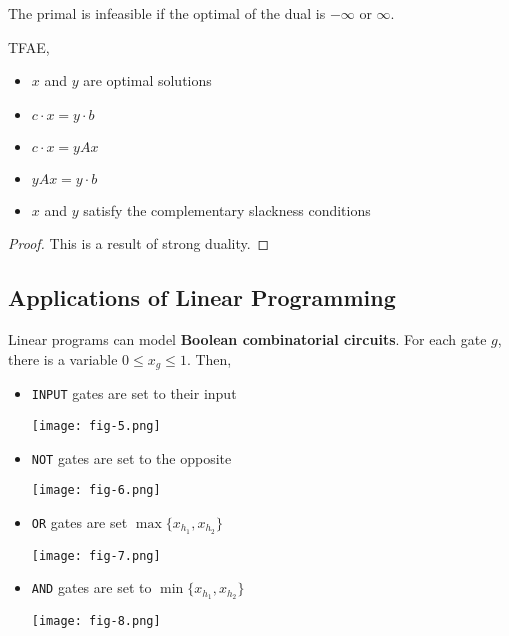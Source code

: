 	\begin{rmk}
		The primal is infeasible if the optimal of the dual is $-\infty$ or $\infty$.
	\end{rmk}

	\begin{thm}
		TFAE,
		\begin{itemize}
			\item $x$ and $y$ are optimal solutions
			\item $c \cdot x = y \cdot b$
			\item $c \cdot x = yAx$
			\item $yAx = y \cdot b$
			\item $x$ and $y$ satisfy the complementary slackness conditions
		\end{itemize}
	\end{thm}

	\begin{proof}
		This is a result of strong duality.
	\end{proof}

	\subsection{Applications of Linear Programming}

	\begin{marginfigure}
		Linear programs can model \textbf{Boolean combinatorial circuits}. For each gate $g$, there is a variable $0 \leq x_g \leq 1$. Then,
		\begin{itemize}
			\item \texttt{INPUT} gates are set to their input

			\begin{center}
				\texttt{[image: fig-5.png]}
			\end{center}
			
			\item \texttt{NOT} gates are set to the opposite

			\begin{center}
				\texttt{[image: fig-6.png]}
			\end{center}
			
			\item \texttt{OR} gates are set $\max \{x_{h_1}, x_{h_2}\}$

			\begin{center}
				\texttt{[image: fig-7.png]}
			\end{center}
			
			\item \texttt{AND} gates are set to $\min \{x_{h_1}, x_{h_2}\}$

			\begin{center}
				\texttt{[image: fig-8.png]}
			\end{center}
			
			
		\end{itemize}
	\end{marginfigure}

